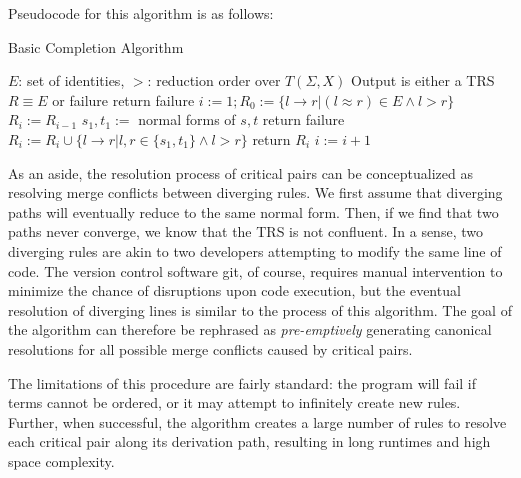 \documentclass{article}
\begin{document}
Pseudocode for this algorithm is as follows:
\begin{algorithm}[H]
\caption{Basic Completion Algorithm}\label{alg:cap}
\begin{algorithmic}
\Require $E$: set of identities, $>$: reduction order over $T(\Sigma,X)$
\Ensure Output is either a TRS $R \equiv E$ or failure
return failure
\EndIf
\State $i:=1; R_0 := \{l \rightarrow r | (l \approx r) \in E \land l > r\}$
\State $R_i := R_{i-1}$
\State $s_1,t_1 :=$ normal forms of $s,t$
return failure
\EndIf
\State $R_i := R_i \cup \{l \rightarrow r | l,r \in \{s_1, t_1\} \land l > r\}$
\EndFor
{}
return $R_i$
\EndIf
\State $i := i+1$
\EndWhile
\end{algorithmic}
\end{algorithm}

As an aside, the resolution process of critical pairs can be conceptualized as resolving merge conflicts between diverging rules.
We first assume that diverging paths will eventually reduce to the same normal form. Then, if we find that two
paths never converge, we know that the TRS is not confluent.
In a sense, two diverging rules are akin to two developers attempting to modify the same line of code. The version control software git, of course, requires manual intervention
to minimize the chance of disruptions upon code execution, but the eventual resolution of diverging lines is similar to the process of this algorithm.
The goal of the algorithm can therefore be rephrased as \textit{pre-emptively} generating canonical resolutions for all possible merge conflicts caused by critical pairs.

The limitations of this procedure are fairly standard: the program will fail if terms cannot be ordered, or it may attempt to infinitely create new rules.
Further, when successful, the algorithm creates a large number of rules to resolve each critical pair along its derivation path, resulting in
long runtimes and high space complexity.
\end{document}
